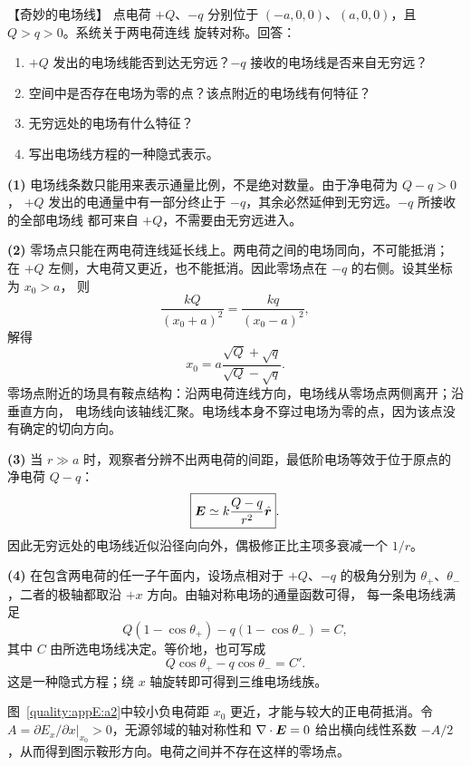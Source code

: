 \begin{origexamplebox}{【奇妙的电场线】}\label{appE:ex:s18-29-2}
点电荷 $+Q$、$-q$ 分别位于 $(-a,0,0)$、$(a,0,0)$，且 $Q>q>0$。系统关于两电荷连线
旋转对称。回答：
\begin{enumerate}[label=(\arabic*),leftmargin=2.2em]
  \item $+Q$ 发出的电场线能否到达无穷远？$-q$ 接收的电场线是否来自无穷远？
  \item 空间中是否存在电场为零的点？该点附近的电场线有何特征？
  \item 无穷远处的电场有什么特征？
  \item 写出电场线方程的一种隐式表示。
\end{enumerate}
\end{origexamplebox}

\begin{xesolution}
\textbf{(1)} 电场线条数只能用来表示通量比例，不是绝对数量。由于净电荷为 $Q-q>0$，
$+Q$ 发出的电通量中有一部分终止于 $-q$，其余必然延伸到无穷远。$-q$ 所接收的全部电场线
都可来自 $+Q$，不需要由无穷远进入。

\textbf{(2)} 零场点只能在两电荷连线延长线上。两电荷之间的电场同向，不可能抵消；
在 $+Q$ 左侧，大电荷又更近，也不能抵消。因此零场点在 $-q$ 的右侧。设其坐标为 $x_0>a$，
则
\[
  \frac{kQ}{(x_0+a)^2}=\frac{kq}{(x_0-a)^2},
\]
解得
\[
  \boxed{x_0=a\frac{\sqrt Q+\sqrt q}{\sqrt Q-\sqrt q}}.
\]
零场点附近的场具有鞍点结构：沿两电荷连线方向，电场线从零场点两侧离开；沿垂直方向，
电场线向该轴线汇聚。电场线本身不穿过电场为零的点，因为该点没有确定的切向方向。

\textbf{(3)} 当 $r\gg a$ 时，观察者分辨不出两电荷的间距，最低阶电场等效于位于原点的
净电荷 $Q-q$：
\[
  \boxed{\bm{E}\simeq k\frac{Q-q}{r^2}\hat{\bm{r}}}.
\]
因此无穷远处的电场线近似沿径向向外，偶极修正比主项多衰减一个 $1/r$。

\textbf{(4)} 在包含两电荷的任一子午面内，设场点相对于 $+Q$、$-q$ 的极角分别为
$\theta_+$、$\theta_-$，二者的极轴都取沿 $+x$ 方向。由轴对称电场的通量函数可得，
每一条电场线满足
\[
  \boxed{Q(1-\cos\theta_+)-q(1-\cos\theta_-)=C},
\]
其中 $C$ 由所选电场线决定。等价地，也可写成
\[
  Q\cos\theta_+-q\cos\theta_-=C'.
\]
这是一种隐式方程；绕 $x$ 轴旋转即可得到三维电场线族。


图~\ref{quality:appE:a2}中较小负电荷距 $x_0$ 更近，才能与较大的正电荷抵消。令 $A=\partial E_x/\partial x|_{x_0}>0$，无源邻域的轴对称性和 $\nabla\cdot\bm{E}=0$ 给出横向线性系数 $-A/2$，从而得到图示鞍形方向。电荷之间并不存在这样的零场点。
\end{xesolution}

